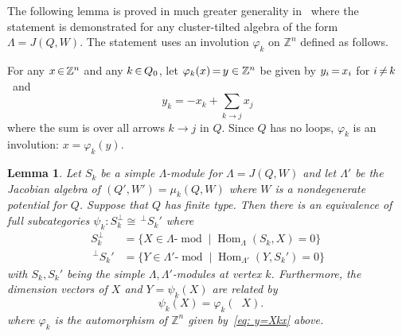 \documentclass[10pt]{amsart}
\newtheorem{lemm}[theo]{Lemma}
\theoremstyle{definition}
\DeclareMathOperator{\Hom}{Hom}%
\DeclareMathOperator{\undim}{\underline{dim}}
\DeclareMathOperator{\modr}{mod}
\newcommand{\field}[1]{\mathbb{#1}}
\newcommand{\ZZ}{\ensuremath{{\field{Z}}}}
\newcommand*{\Mk}{\mkern -2mu}
\begin{document}


The following lemma is proved in much greater generality in~\cite[Sec~7]{BIRSm} where the statement is demonstrated for any cluster-tilted algebra of the form $\Lambda=J(Q,W)$. The statement uses an involution $\varphi_k$ on $\ZZ^n$ defined as follows.

For any $x \Mk \in \Mk \ZZ^n$ and any $k\Mk \in \Mk Q_0$, let $\varphi_k(x)\Mk =\Mk y\in \ZZ^n$ be given by $y_i\Mk =\Mk x_i$ for $i\Mk \neq \Mk k$~and
\begin{equation}\label{eq: y=Xkx}
	y_k=-x_k+\sum_{k\to j} x_j
\end{equation}
where the sum is over all arrows $k\to j$ in $Q$.
Since $Q$ has no loops, $\varphi_k$ is an involution: $x=\varphi_k(y)$.


\begin{lemm}\label{lem: inductive step A=B for Q finite type}
Let $S_k$ be a simple $\Lambda$-module for $\Lambda=J(Q,W)$ and let $\Lambda'$ be the Jacobian algebra of $(Q',W')=\mu_k(Q,W)$ where $W$ is a nondegenerate potential for $Q$. Suppose that $Q$ has finite type. Then there is an equivalence of full subcategories $\psi_k:S_k^\perp\cong \,^{\perp}S_k'$ where
\[
\begin{aligned}
	S_k^\perp&=\{X\in \Lambda\text{-}\modr \mid %
	\Hom_\Lambda(S_k,X)=0\}
\\
	\,^{\perp}S_k'&=\{Y\in \Lambda'\text{-}\modr\mid \Hom_{\Lambda'}(Y,S_k')=0\}
\end{aligned}
\]
with $S_k,S_k'$ being the simple $\Lambda,\Lambda'$-modules at vertex $k$. Furthermore, the dimension vectors of $X$ and $Y=\psi_k(X)$ are related by
\[
	\undim \psi_k(X)=\varphi_k(\undim X).
\]
where $\varphi_k$ is the automorphism of $\ZZ^n$ given by~\eqref{eq: y=Xkx} above.
\end{lemm}
\end{document}
